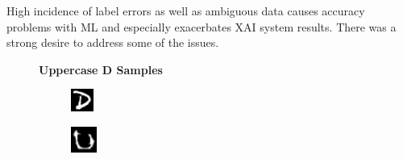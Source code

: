 \documentclass[conference]{IEEEtran}
\begin{document}
High incidence of label errors as well as ambiguous data causes accuracy
problems with ML and especially exacerbates XAI system results.  There was a
strong desire to address some of the issues.

\begin{figure}[h]
    \centering
    \textbf{Uppercase D Samples}\par\medskip 
    \begin{subfigure}{.10\textwidth}
        \centering
        \includegraphics[width=.90\textwidth]{./images/issues/D-0.png}
        \label{fig:issue_D01}
    \end{subfigure}%
    \begin{subfigure}{.10\textwidth}
        \centering
        \includegraphics[width=.90\textwidth]{./images/issues/D-01.png}

\end{subfigure}
\end{figure}
\end{document}
